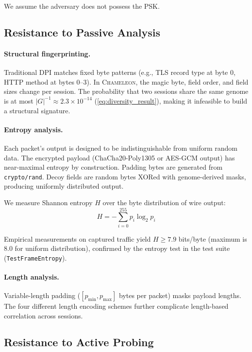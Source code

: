 \documentclass[11pt,a4paper]{article}
\let\oldparagraph\paragraph
\renewcommand{\paragraph}[1]{\needspace{5\baselineskip}\oldparagraph{#1}}
\newcommand{\chameleon}{\textsc{Chameleon}}
\begin{document}
We assume the adversary does not possess the PSK.

\subsection{Resistance to Passive Analysis}

\paragraph{Structural fingerprinting.} Traditional DPI matches fixed byte patterns (e.g., TLS record type at byte 0, HTTP method at bytes 0--3). In \chameleon{}, the magic byte, field order, and field sizes change per session. The probability that two sessions share the same genome is at most $|G|^{-1} \approx 2.3 \times 10^{-14}$ (\cref{eq:diversity_result}), making it infeasible to build a structural signature.

\paragraph{Entropy analysis.} Each packet's output is designed to be indistinguishable from uniform random data. The encrypted payload (ChaCha20-Poly1305 or AES-GCM output) has near-maximal entropy by construction. Padding bytes are generated from \texttt{crypto/rand}. Decoy fields are random bytes XORed with genome-derived masks, producing uniformly distributed output.

We measure Shannon entropy $H$ over the byte distribution of wire output:
\begin{equation}
  H = -\sum_{i=0}^{255} p_i \log_2 p_i
\end{equation}

Empirical measurements on captured traffic yield $H \geq 7.9$ bits/byte (maximum is 8.0 for uniform distribution), confirmed by the entropy test in the test suite (\texttt{TestFrameEntropy}).

\paragraph{Length analysis.} Variable-length padding ($[p_{\min}, p_{\max}]$ bytes per packet) masks payload lengths. The four different length encoding schemes further complicate length-based correlation across sessions.

\subsection{Resistance to Active Probing}
\end{document}
